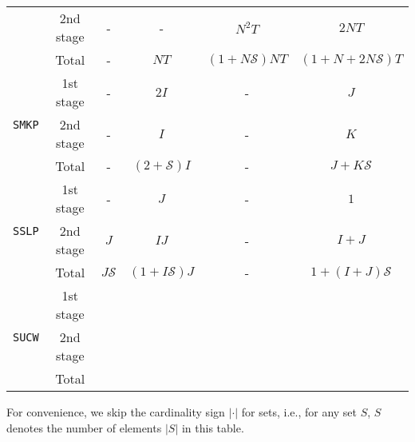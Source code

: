\begin{table}[H]
{\begin{threeparttable}
\begin{tabular}{@{}cccccc@{}}
				& 2nd stage & -              & -                                  & $N^2 T$              & $2NT$                     \\ \cmidrule(l){2-6} 
				& Total          & -              & $NT$                               & $(1+N\mathcal{S})NT$ & $(1+N+2N\mathcal{S})T$    \\ \midrule
				\multirow{3}{*}{\texttt{SMKP}}   & 1st stage & -              & $2I$                               & -                    & $J$                       \\
				& 2nd stage & -              & $I$                                & -                    & $K$                       \\ \cmidrule(l){2-6} 
				& Total          & -              & $(2+\mathcal{S})I$                 & -                    & $J+K\mathcal{S}$          \\ \midrule
				\multirow{3}{*}{\texttt{SSLP}}   & 1st stage & -              & $J$                                & -                    & $1$                       \\
				& 2nd stage & $J$            & $IJ$                               & -                    & $I+J$                     \\ \cmidrule(l){2-6} 
				& Total          & $J\mathcal{S}$ & $(1+I\mathcal{S})J$                & -                    & $1+(I+J)\mathcal{S}$      \\ \midrule
				\multirow{3}{*}{\texttt{SUCW}}   & 1st stage &                &                                    &                      &                           \\
				& 2nd stage &                &                                    &                      &                           \\ \cmidrule(l){2-6} 
				& Total          &                &                                    &                      &                           \\ \bottomrule
			\end{tabular}
	
			\begin{tablenotes}
				\small
				\item For convenience, we skip the cardinality sign $|\cdot|$ for sets, i.e., for any set $S$, $S$ denotes the number of elements $|S|$ in this table.
			\end{tablenotes}
		\end{threeparttable}
	}
\end{table}


